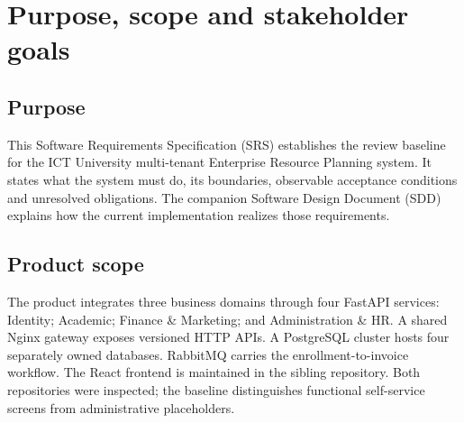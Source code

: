 \documentclass[10pt,a4paper]{article}
\begin{document}

\section{Purpose, scope and stakeholder goals}
\subsection{Purpose}
This Software Requirements Specification (SRS) establishes the review baseline
for the ICT University multi-tenant Enterprise Resource Planning system.
It states what the system must do, its boundaries, observable acceptance conditions
and unresolved obligations. The companion Software Design Document (SDD) explains
how the current implementation realizes those requirements.

\subsection{Product scope}
The product integrates three business domains through four FastAPI services:
Identity; Academic; Finance \& Marketing; and Administration \& HR. A shared Nginx
gateway exposes versioned HTTP APIs. A PostgreSQL cluster hosts four separately
owned databases. RabbitMQ carries the enrollment-to-invoice workflow.
The React frontend is maintained in the sibling  repository.
Both repositories were inspected; the baseline distinguishes functional self-service
screens from administrative placeholders.
\end{document}
